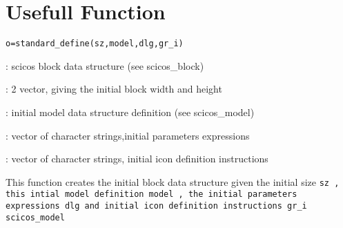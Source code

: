 \section{Usefull Function}



%
%


\label{standarddefine}

\begin{verbatim}
o=standard_define(sz,model,dlg,gr_i)
\end{verbatim}
\begin{scitem}
\item[{\verb?o?}]
: scicos block data structure (see scicos\_block)
\item[{\verb?sz?}]
: 2 vector, giving the initial block width and height 
\item[{\verb?model?}]
: initial model data structure definition (see scicos\_model)
\item[{\verb?dlg?}]
: vector of character strings,initial parameters expressions
\item[{\verb?gr\_i?}]
: vector of character strings, initial icon definition instructions 
\end{scitem}%
This function creates the initial block data structure given the
initial size  %
\tt sz%
\rm , this intial model definition  %
\tt model%
\rm , the
initial parameters expressions  %
\tt dlg %
\rm and initial icon definition
instructions  %
\tt gr\_i %
\rm {}
{\verb?scicos_model?} \pageref{scicosmodel}


%
%


\label{standarddraw}

